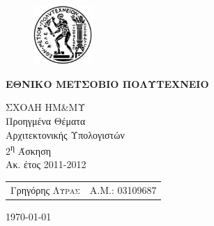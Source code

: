 \begin{titlepage}
    \begin{center}
        \begin{figure}[h] 
            \includegraphics[width=0.2\textwidth]{title/ntua_logo}
        \end{figure}
        \vspace{1cm}
        \begin{LARGE}\textbf{ΕΘΝΙΚΟ ΜΕΤΣΟΒΙΟ ΠΟΛΥΤΕΧΝΕΙΟ\\[1.5cm]}\end{LARGE}
        \begin{Large}
            ΣΧΟΛΗ ΗΜ\&ΜΥ\\[2cm]
            Προηγμένα Θέματα\\
            Αρχιτεκτονικής Υπολογιστών\\[2cm]
            2\textsuperscript{η} Άσκηση\\
            Ακ. έτος 2011-2012\\
        \end{Large}
        \vfill
        \begin{flushright}
            \begin{tabular}{l r}
                {Γρηγόρης \textsc{Λύρας}}&
                {Α.Μ.: 03109687}\\
            \end{tabular}
        \end{flushright}

        \large\today\\
    \end{center}
\end{titlepage}


